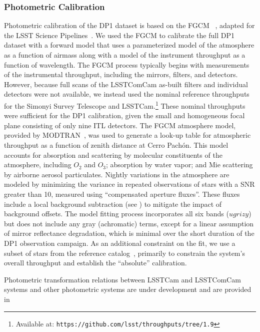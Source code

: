 \subsubsection{Photometric Calibration}
\label{photometric_calibration}
Photometric \gls{calibration} of the \gls{DP1} dataset is based on the \gls{FGCM} ~\citep{2018AJ....155...41B}, adapted for the LSST Science Pipelines~\citep{2022PASJ...74..247A, SITCOMTN-086}.
We used the \gls{FGCM} to calibrate the full \gls{DP1} dataset with a forward model that uses a parameterized model of the atmosphere as a function of airmass along with a model of the instrument throughput as a function of wavelength.
The FGCM process typically begins with measurements of the instrumental throughput, including the mirrors, filters, and detectors.
However, because full scans of the \gls{LSSTComCam} as-built filters and individual detectors were not available, we instead used the nominal reference throughputs for the Simonyi Survey Telescope and LSSTCam.\footnote{Available at: \nolinkurl{https://github.com/lsst/throughputs/tree/1.9}}
These nominal throughputs were sufficient for the \gls{DP1} calibration, given the small and homogeneous focal plane consisting of only nine \gls{ITL} detectors.
The FGCM atmosphere model, provided by MODTRAN~\citep{1999SPIE.3756..348B}, was used to generate a look-up table for atmospheric throughput as a function of zenith distance at Cerro Pachón.
This model accounts for absorption and scattering by molecular constituents of the atmosphere, including $O_2$ and $O_3$; absorption by water vapor; and Mie scattering by airborne aerosol particulates.
Nightly variations in the atmosphere are modeled by minimizing the variance in repeated observations of stars with a \gls{SNR} greater than 10, measured using ``compensated aperture fluxes''.
These fluxes include a local \gls{background} subtraction (see ) to mitigate the impact of \gls{background} offsets.
The model fitting process incorporates all six bands ($ugrizy$) but does not include any gray (achromatic) terms, except for a linear assumption of mirror reflectance degradation, which is minimal over the short duration of the \gls{DP1} observation campaign.
As an additional constraint on the fit, we use a subset of stars from the reference catalog~\citep{DMTN-277}, primarily to constrain the system's overall throughput and establish the ``absolute'' calibration.

Photometric transformation relations between \gls{LSSTCam} and \gls{LSSTComCam} systems and other photometric systems are under development and are provided  in \citep{RTN-099}

